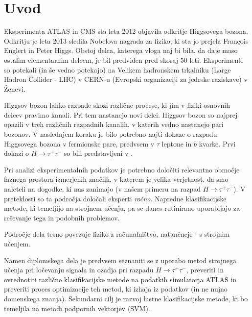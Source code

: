 \documentclass[11pt,a4paper,openany]{book}
\begin{document}
\chapter*{Uvod}

Eksperimenta ATLAS in CMS sta leta 2012 objavila odkritje Higgsovega bozona\cite{Aad20121,Chatrchyan201230}. Odkritju je leta 2013 sledila Nobelova nagrada za fiziko, ki sta jo prejela François Englert in Peter Higgs. Obstoj delca, katerega vloga naj bi bila, da daje maso ostalim elementarnim delcem, je bil predviden pred skoraj 50 leti. Eksperimenti so potekali (in še vedno potekajo) na Velikem hadronskem trkalniku (Large Hadron Collider - LHC) v CERN-u (Evropski organizaciji za jedrske raziskave) v Ženevi\cite{ChallengeDoc}.

Higgsov bozon lahko razpade skozi različne procese, ki jim v fiziki osnovnih delcev pravimo kanali. Pri tem nastanejo novi delci. Higgsov bozon so najprej opazili v treh različnih razpadnih kanalih, v katerih vedno nastanejo pari bozonov. V naslednjem koraku je bilo potrebno najti dokaze o razpadu Higgsovega bozona v fermionske pare, predvsem v $\tau$ leptone in $b$ kvarke. Prvi dokazi o $H \rightarrow \tau^+\tau^-$ so bili predstavljeni v \cite{atlas2013}. 

Pri analizi eksperimentalnih podatkov je potrebno določiti relevantno območje faznega prostora izmerjenih značilk, v katerem je velika verjetnost, da smo naleteli na dogodke, ki nas zanimajo (v našem primeru na razpad $H \rightarrow \tau^+\tau^-$). V preteklosti so ta področja določali eksperti \textit{ročno}\cite{Adam-Bourdarios14}. Napredne klasifikacijske metode, ki temeljijo na strojnem učenju, pa se danes rutinirano uporabljajo za reševanje tega in podobnih problemov\cite{atlas2013}.

Področje dela tesno povezuje fiziko z računalništvo, natančneje - s strojnim učenjem. 

Namen diplomskega dela je predvsem seznaniti se z uporabo metod strojnega učenja pri ločevanju signala in ozadja pri razpadu $H \rightarrow \tau^+\tau^-$, preveriti in ovrednotiti različne klasifikacijske metode na podatkih simulatorja ATLAS in preveriti proces optimizacije teh metod, ki izhaja iz podatkov (in ne nujno domenskega znanja). Sekundarni cilj je razvoj lastne klasifikacijske metode, ki bo temeljila na metodi podpornih vektorjev (SVM).
\end{document}
